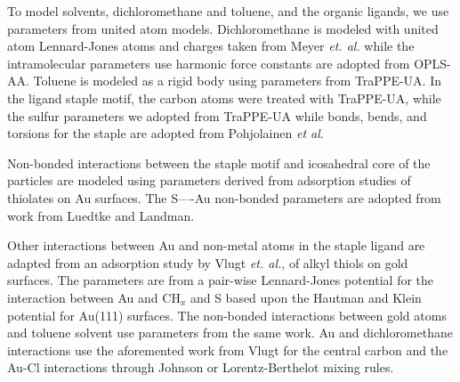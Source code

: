 To model solvents, dichloromethane and toluene, and the organic ligands, we use parameters from united atom models.
Dichloromethane is modeled with united atom Lennard-Jones atoms and charges taken from Meyer \textit{et. al.}\cite{Meyer1978} while the intramolecular parameters use harmonic force constants are adopted from OPLS-AA.\cite{Jorgensen98a}
Toluene is modeled as a rigid body using parameters from TraPPE-UA.\cite{TraPPE-UA.alkylbenzenes} %
In the ligand staple motif, the carbon atoms were treated with TraPPE-UA,\cite{TraPPE-UA.alkanes,TraPPE-UA.alkylbenzenes,TraPPE-UA.thiols} while the sulfur parameters we adopted from TraPPE-UA\cite{TraPPE-UA.thiols} while bonds, bends, and torsions for the staple are adopted from Pohjolainen \textit{et al}.\cite{Pohjolainen2016}

Non-bonded interactions between the staple motif and icosahedral core of the particles are modeled using parameters derived from adsorption studies of thiolates on Au surfaces.
The S—-Au non-bonded parameters are adopted from work from Luedtke and Landman.\cite{landman:1998}

Other interactions between Au and non-metal atoms in the staple ligand are adapted from an adsorption study by Vlugt \textit{et. al.},\cite{vlugt:cpc2007154} of alkyl thiols on gold surfaces. The parameters are from a pair-wise Lennard-Jones potential for the interaction between Au and $\mathrm{CH}_x$ and S based upon the Hautman and Klein potential for Au(111) surfaces.\cite{hautman:4994}
The non-bonded interactions between gold atoms and toluene solvent use parameters from the same work.
Au and dichloromethane interactions use the aforemented work from Vlugt for the central carbon and the Au-Cl interactions through Johnson or Lorentz-Berthelot mixing rules.\cite{Johnson89}


